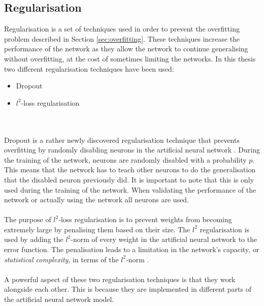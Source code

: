 \subsection{Regularisation}\label{sec:regularisation}
Regularisation is a set of techniques used in order to prevent the overfitting problem described in Section \ref{sec:overfitting}. These techniques increase the performance of the network as they allow the network to continue generalising without overfitting, at the cost of sometimes limiting the networks. In this thesis two different regularisation techniques have been used:
\begin{itemize}
    \item Dropout
    \item $l^2$-loss regularisation
\end{itemize}
\\\\
Dropout is a rather newly discovered regularisation technique that prevents overfitting by randomly disabling neurons in the artificial neural network \parencite{srivastava2014dropout}. During the training of the network, neurons are randomly disabled with a probability $p$. This means that the network has to teach other neurons to do the generalisation that the disabled neuron previously did. It is important to note that this is only used during the training of the network. When validating the performance of the network or actually using the network all neurons are used.
\\\\
The purpose of $l^2$-loss regularisation is to prevent weights from becoming extremely large by penalising them based on their size. The $l^2$ regularisation is used by adding the $l^2$-norm of every weight in the artificial neural network to the error function. The penalisation leads to a limitation in the network's capacity, or \textit{statistical complexity}, in terms of the $l^2$-norm \parencite{neyshabur2015norm}. 
\\\\
A powerful aspect of these two regularisation techniques is that they work alongside each other. This is because they are implemented in different parts of the artificial neural network model.

